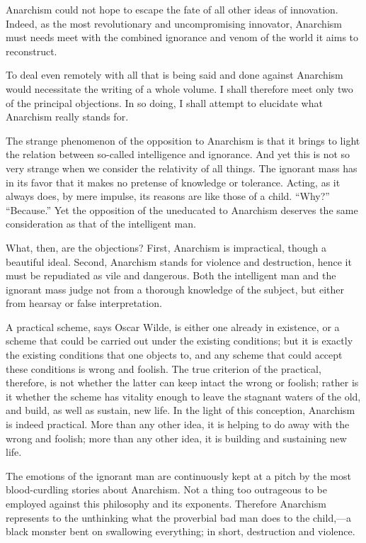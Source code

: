 Anarchism could not hope to escape the fate of all other ideas of
innovation. Indeed, as the most revolutionary and uncompromising
innovator, Anarchism must needs meet with the combined ignorance and
venom of the world it aims to reconstruct.

To deal even remotely with all that is being said and done against
Anarchism would necessitate the writing of a whole volume. I shall
therefore meet only two of the principal objections. In so doing, I
shall attempt to elucidate what Anarchism really stands for.

The strange phenomenon of the opposition to Anarchism is that it
brings to light the relation between so-called intelligence and
ignorance. And yet this is not so very strange when we consider the
relativity of all things. The ignorant mass has in its favor that it
makes no pretense of knowledge or tolerance. Acting, as it always
does, by mere impulse, its reasons are like those of a child. ``Why?''
``Because.'' Yet the opposition of the uneducated to Anarchism
deserves the same consideration as that of the intelligent man.

What, then, are the objections? First, Anarchism is
impractical, though a beautiful ideal. Second, Anarchism stands for
violence and destruction, hence it must be repudiated as vile and
dangerous. Both the intelligent man and the ignorant mass judge not
from a thorough knowledge of the subject, but either from hearsay or
false interpretation.

A practical scheme, says Oscar Wilde, is either one already in
existence, or a scheme that could be carried out under the existing
conditions; but it is exactly the existing conditions that one objects
to, and any scheme that could accept these conditions is wrong and
foolish. The true criterion of the practical, therefore, is not
whether the latter can keep intact the wrong or foolish; rather is it
whether the scheme has vitality enough to leave the stagnant waters of
the old, and build, as well as sustain, new life. In the light of this
conception, Anarchism is indeed practical. More than any other idea,
it is helping to do away with the wrong and foolish; more than any
other idea, it is building and sustaining new life.

The emotions of the ignorant man are continuously kept at a pitch by
the most blood-curdling stories about Anarchism. Not a thing too
outrageous to be employed against this philosophy and its exponents.
Therefore Anarchism represents to the unthinking what the proverbial
bad man does to the child,---a black monster bent on swallowing
everything; in short, destruction and violence.

